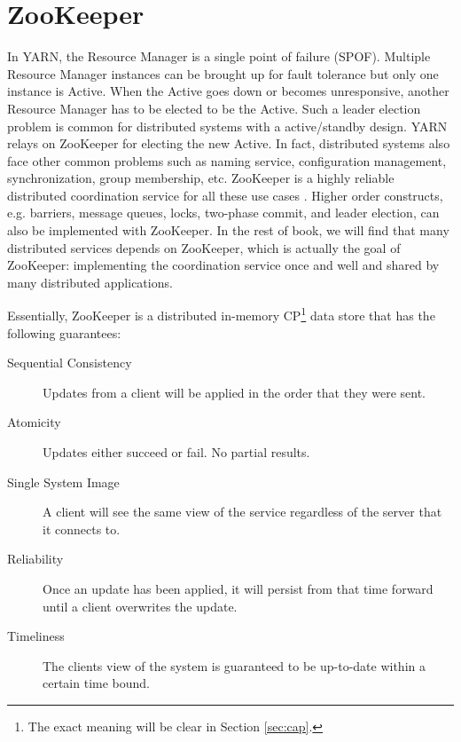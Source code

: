 \documentclass[11pt]{book}
\begin{document}
\section[ZooKeeper]
{ZooKeeper}
In YARN, the Resource Manager is a single point of failure (SPOF). Multiple Resource Manager instances can be brought up for fault tolerance but only one instance is Active. 
When the Active goes down or becomes unresponsive, another Resource Manager has to be elected to be the Active. Such a leader election problem is common for distributed systems with a active/standby design. YARN relays on ZooKeeper for electing the new Active. In fact, distributed systems also face other common problems such as naming service, configuration management, synchronization, group membership, etc. ZooKeeper is a highly reliable distributed coordination service for all these use cases \cite{ZooKeeper}. Higher order constructs, e.g. barriers, message queues, locks, two-phase commit, and leader election, can also be implemented with ZooKeeper. In the rest of book, we will find that many distributed services depends on ZooKeeper, which is actually the goal of ZooKeeper: implementing the coordination service once and well and shared by many distributed applications.

Essentially, ZooKeeper is a distributed in-memory CP\footnote{The exact meaning will be clear in Section \ref{sec:cap}.} data store that has the following guarantees:
\begin{description}
\item[Sequential Consistency] Updates from a client will be applied in the order that they were sent.
\item[Atomicity] Updates either succeed or fail. No partial results.
\item[Single System Image] A client will see the same view of the service regardless of the server that it connects to.
\item[Reliability] Once an update has been applied, it will persist from that time forward until a client overwrites the update.
\item[Timeliness] The clients view of the system is guaranteed to be up-to-date within a certain time bound.
\end{description}
\end{document}
